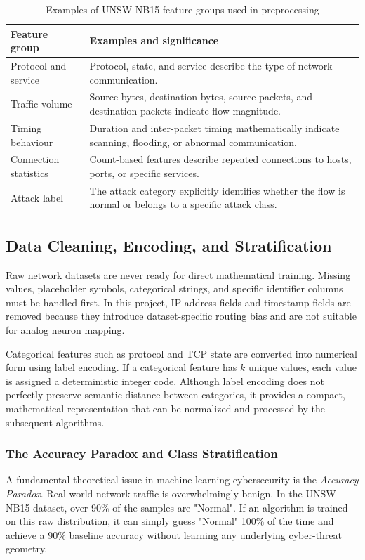 \documentclass{ieeeaccess}
\begin{document}
\begin{table}[H]
\centering
\caption{Examples of UNSW-NB15 feature groups used in preprocessing}
\label{tab:featuregroups}
\begin{tabular}{|p{}|p{}|}
\hline
\textbf{Feature group} & \textbf{Examples and significance} \\
\hline
Protocol and service & Protocol, state, and service describe the type of network communication. \\
\hline
Traffic volume & Source bytes, destination bytes, source packets, and destination packets indicate flow magnitude. \\
\hline
Timing behaviour & Duration and inter-packet timing mathematically indicate scanning, flooding, or abnormal communication. \\
\hline
Connection statistics & Count-based features describe repeated connections to hosts, ports, or specific services. \\
\hline
Attack label & The attack category explicitly identifies whether the flow is normal or belongs to a specific attack class. \\
\hline
\end{tabular}
\end{table}

\subsection{Data Cleaning, Encoding, and Stratification}

Raw network datasets are never ready for direct mathematical training. Missing values, placeholder symbols, categorical strings, and specific identifier columns must be handled first. In this project, IP address fields and timestamp fields are removed because they introduce dataset-specific routing bias and are not suitable for analog neuron mapping. 

Categorical features such as protocol and TCP state are converted into numerical form using label encoding. If a categorical feature has $k$ unique values, each value is assigned a deterministic integer code. Although label encoding does not perfectly preserve semantic distance between categories, it provides a compact, mathematical representation that can be normalized and processed by the subsequent algorithms.

\subsubsection{The Accuracy Paradox and Class Stratification}
A fundamental theoretical issue in machine learning cybersecurity is the \textit{Accuracy Paradox}. Real-world network traffic is overwhelmingly benign. In the UNSW-NB15 dataset, over 90\% of the samples are "Normal". If an algorithm is trained on this raw distribution, it can simply guess "Normal" 100\% of the time and achieve a 90\% baseline accuracy without learning any underlying cyber-threat geometry.
\end{document}
